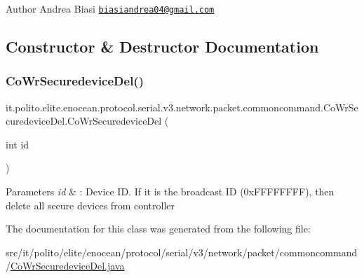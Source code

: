 \begin{DoxyAuthor}{Author}
Andrea Biasi \href{mailto:biasiandrea04@gmail.com}{\tt biasiandrea04@gmail.\+com} 
\end{DoxyAuthor}


\subsection{Constructor \& Destructor Documentation}
\hypertarget{classit_1_1polito_1_1elite_1_1enocean_1_1protocol_1_1serial_1_1v3_1_1network_1_1packet_1_1common16165503087443ca110918c895f44b44_aa4bdba82d086c3fdfc8f2b09be7a07ca}{}\label{classit_1_1polito_1_1elite_1_1enocean_1_1protocol_1_1serial_1_1v3_1_1network_1_1packet_1_1common16165503087443ca110918c895f44b44_aa4bdba82d086c3fdfc8f2b09be7a07ca} 
\subsubsection{\texorpdfstring{Co\+Wr\+Securedevice\+Del()}{CoWrSecuredeviceDel()}}
{\footnotesize\ttfamily it.\+polito.\+elite.\+enocean.\+protocol.\+serial.\+v3.\+network.\+packet.\+commoncommand.\+Co\+Wr\+Securedevice\+Del.\+Co\+Wr\+Securedevice\+Del (\begin{DoxyParamCaption}\item[{int}]{id }\end{DoxyParamCaption})}


\begin{DoxyParams}{Parameters}
{\em id} & \+: Device ID. If it is the broadcast ID (0x\+F\+F\+F\+F\+F\+F\+FF), then delete all secure devices from controller \\
\hline
\end{DoxyParams}


The documentation for this class was generated from the following file\+:\begin{DoxyCompactItemize}
\item 
src/it/polito/elite/enocean/protocol/serial/v3/network/packet/commoncommand/\hyperlink{_co_wr_securedevice_del_8java}{Co\+Wr\+Securedevice\+Del.\+java}\end{DoxyCompactItemize}
